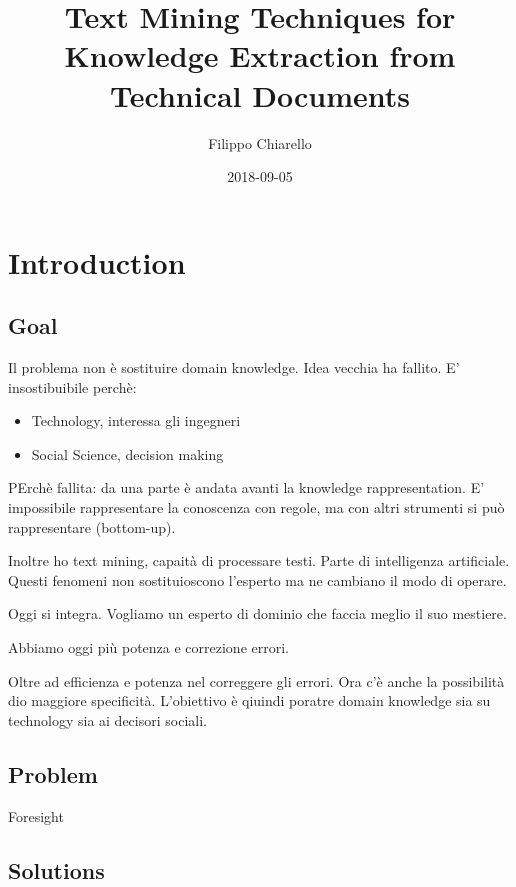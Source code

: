 \documentclass[]{book}
\title{Text Mining Techniques for Knowledge Extraction from Technical Documents}
\author{Filippo Chiarello}
\date{2018-09-05}
\providecommand{\tightlist}{%
  \setlength{\itemsep}{0pt}\setlength{\parskip}{0pt}}
\begin{document}
\maketitle

{
\setcounter{tocdepth}{1}
\tableofcontents
}
\chapter{Introduction}\label{introduction}

\section{Goal}\label{goal}

Il problema non è sostituire domain knowledge. Idea vecchia ha fallito.
E' insostibuibile perchè:

\begin{itemize}
\tightlist
\item
  Technology, interessa gli ingegneri
\item
  Social Science, decision making
\end{itemize}

PErchè fallita: da una parte è andata avanti la knowledge
rappresentation. E' impossibile rappresentare la conoscenza con regole,
ma con altri strumenti si può rappresentare (bottom-up).

Inoltre ho text mining, capaità di processare testi. Parte di
intelligenza artificiale. Questi fenomeni non sostituioscono l'esperto
ma ne cambiano il modo di operare.

Oggi si integra. Vogliamo un esperto di dominio che faccia meglio il suo
mestiere.

Abbiamo oggi più potenza e correzione errori.

Oltre ad efficienza e potenza nel correggere gli errori. Ora c'è anche
la possibilità dio maggiore specificità. L'obiettivo è qiuindi poratre
domain knowledge sia su technology sia ai decisori sociali.

\section{Problem}\label{problem}

Foresight

\section{Solutions}\label{solutions}
\end{document}
